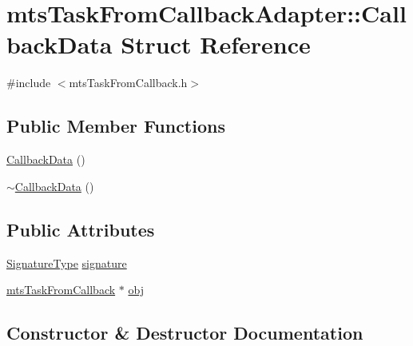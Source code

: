 \hypertarget{structmts_task_from_callback_adapter_1_1_callback_data}{}\section{mts\+Task\+From\+Callback\+Adapter\+:\+:Callback\+Data Struct Reference}
\label{structmts_task_from_callback_adapter_1_1_callback_data}


{\ttfamily \#include $<$mts\+Task\+From\+Callback.\+h$>$}

\subsection*{Public Member Functions}
\begin{DoxyCompactItemize}
\item 
\hyperlink{structmts_task_from_callback_adapter_1_1_callback_data_abad12ea5eefed0f86f22da9db6cb5767}{Callback\+Data} ()
\item 
\hyperlink{structmts_task_from_callback_adapter_1_1_callback_data_a3aa4913d0ebd0dfd0065a65f6cf3945e}{$\sim$\+Callback\+Data} ()
\end{DoxyCompactItemize}
\subsection*{Public Attributes}
\begin{DoxyCompactItemize}
\item 
\hyperlink{classmts_task_from_callback_adapter_aa81f29d07e560c1b9f5a9f004e49df97}{Signature\+Type} \hyperlink{structmts_task_from_callback_adapter_1_1_callback_data_a657f9a6d041e0ba81dfb27a8610d6650}{signature}
\item 
\hyperlink{classmts_task_from_callback}{mts\+Task\+From\+Callback} $\ast$ \hyperlink{structmts_task_from_callback_adapter_1_1_callback_data_aac5b1768783a485fd26f702739f8e28e}{obj}
\end{DoxyCompactItemize}


\subsection{Constructor \& Destructor Documentation}
\hypertarget{structmts_task_from_callback_adapter_1_1_callback_data_abad12ea5eefed0f86f22da9db6cb5767}{}

